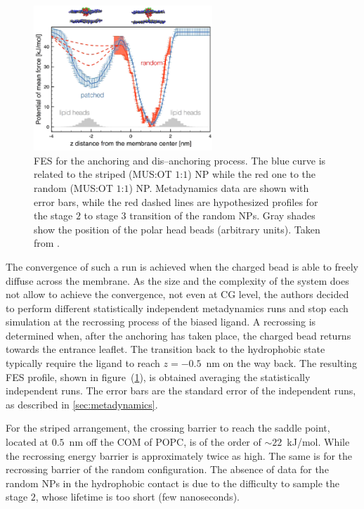 \begin{figure}
	\includegraphics[width=0.6\textwidth]{./img/NPFES}
	\caption{\acs{FES} for the anchoring and dis--anchoring process. The blue curve is related to the striped (\ac{MUS}:\ac{OT} $1$:$1$) \acs{NP} while the red one to the random (\ac{MUS}:\ac{OT} $1$:$1$) \acs{NP}. Metadynamics data are shown with error bars, while the red dashed lines are hypothesized profiles for the stage $2$ to stage $3$ transition of the random \acp{NP}. Gray shades show the position of the polar head beads (arbitrary units). Taken from \cite{ourPaper}.}
	\label{fig:NPFES}
\end{figure}
The convergence of such a run is achieved when the charged bead is able to freely diffuse across 
the membrane. As the size and the complexity of the system does not allow to achieve the convergence, not even at 
\ac{CG} level, the authors decided to perform different statistically independent metadynamics runs and stop each 
simulation at the recrossing process of the biased ligand. A recrossing is determined when, after the anchoring has taken place, the charged bead returns towards the entrance leaflet. The transition back to the hydrophobic state typically require the ligand to reach $z=-0.5$~nm on the way back. The resulting \ac{FES} profile, shown in 
figure~(\ref{fig:NPFES}), is obtained averaging the statistically independent runs. The error bars are the 
standard error of the independent runs, as described in \ref{sec:metadynamics}.

For the striped arrangement, the crossing barrier to reach the saddle point, located at $0.5$~nm off the \ac{COM} 
of \ac{POPC}, is of the order of $\sim 22$~kJ/mol. While the recrossing energy barrier is approximately twice as 
high. The same is for the recrossing barrier of the random configuration. The absence of data for the random 
\acp{NP} in the hydrophobic contact is due to the difficulty to sample the stage $2$, whose lifetime is too short 
(few nanoseconds).

